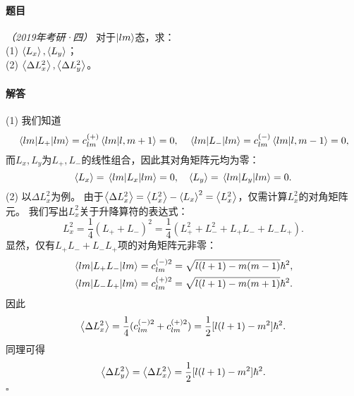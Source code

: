 \begin{tcolorbox}[breakable, title={\textbf{例题}}]
    \paragraph{题目} \textit{（2019年考研·四）}
    对于$\ket{lm}$态，求：\\
    (1) $\expval{L_x}, \expval{L_y}$；\\
    (2) $\expval{\Delta L_x^2}, \expval{\Delta L_y^2}$。

    \paragraph{解答}
    (1) 我们知道
    \begin{equation}
        \mel{lm}{L_+}{lm} = c_{lm}^{(+)} \braket{lm}{l,m+1} = 0, \quad
        \mel{lm}{L_-}{lm} = c_{lm}^{(-)} \braket{lm}{l,m-1} = 0,
    \end{equation}
    而$L_x, L_y$为$L_+, L_-$的线性组合，因此其对角矩阵元均为零：
    \begin{equation}
        \expval{L_x} = \mel{lm}{L_x}{lm} = 0, \quad
        \expval{L_y} = \mel{lm}{L_y}{lm} = 0.
    \end{equation}
    (2) 以$\Delta L_x^2$为例。
    由于$\expval{\Delta L_x^2}=\expval{L_x^2}-\expval{L_x}^2=\expval{L_x^2}$，仅需计算$L_x^2$的对角矩阵元。
    我们写出$L_x^2$关于升降算符的表达式：
    \begin{equation}
        L_x^2 = \frac14 (L_+ + L_-)^2 = \frac14 (L_+^2 + L_-^2 + L_+ L_- + L_- L_+).
    \end{equation}
    显然，仅有$L_+ L_- + L_- L_+$项的对角矩阵元非零：
    \begin{equation}
    \begin{aligned}
        \mel{lm}{L_+ L_-}{lm} &= c_{lm}^{(-)2} = \sqrt{l(l+1)-m(m-1)}\hbar^2, \\
        \mel{lm}{L_- L_+}{lm} &= c_{lm}^{(+)2} = \sqrt{l(l+1)-m(m+1)}\hbar^2.
    \end{aligned}
    \end{equation}
    因此
    \begin{equation}
        \expval{\Delta L_x^2} = \frac14 (c_{lm}^{(-)2} + c_{lm}^{(+)2}) = \frac12 [l(l+1)-m^2]\hbar^2.
    \end{equation}
    同理可得
    \begin{equation}
        \expval{\Delta L_y^2} = \expval{\Delta L_x^2} = \frac12 [l(l+1)-m^2]\hbar^2.
    \end{equation}
    \hfill $\square$
\end{tcolorbox}
